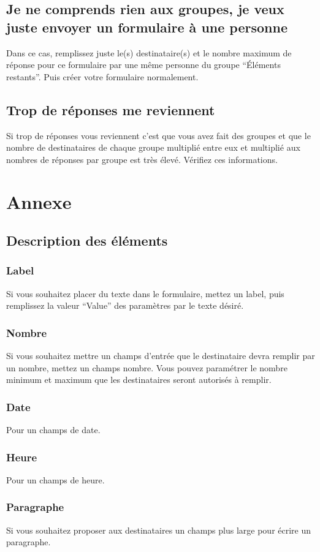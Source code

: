 \documentclass[a4paper,11pt,final]{report}
\begin{document}
\section{Je ne comprends rien aux groupes, je veux juste envoyer un formulaire à une personne}
Dans ce cas, remplissez juste le(s) destinataire(s) et le nombre maximum de réponse pour ce formulaire par une même personne du groupe ``Éléments restants''. Puis créer votre formulaire normalement.
\section{Trop de réponses me reviennent}
Si trop de réponses vous reviennent c'est que vous avez fait des groupes et que le nombre de destinataires de chaque groupe multiplié entre eux et multiplié aux nombres de réponses par groupe est très élevé. Vérifiez ces informations.

\chapter{Annexe}
\section{Description des éléments}
\subsection{Label}
Si vous souhaitez placer du texte dans le formulaire, mettez un label, puis remplissez la valeur ``Value'' des paramètres par le texte désiré.
\subsection{Nombre}
Si vous souhaitez mettre un champs d'entrée que le destinataire devra remplir par un nombre, mettez un champs nombre. Vous pouvez paramétrer le nombre minimum et maximum que les destinataires seront autorisés à remplir.
\subsection{Date}
Pour un champs de date.
\subsection{Heure}
Pour un champs de heure.
\subsection{Paragraphe}
Si vous souhaitez proposer aux destinataires un champs plus large pour écrire un paragraphe.
\end{document}
